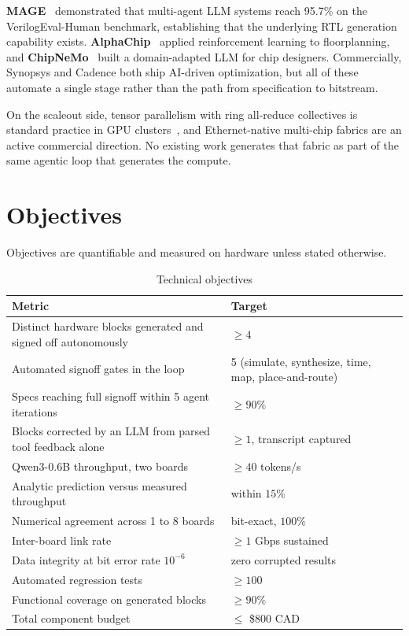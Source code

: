 \documentclass[conference,10pt]{IEEEtran}
\begin{document}
\textbf{MAGE}~\cite{mage} demonstrated that multi-agent LLM systems reach 95.7\% on
the VerilogEval-Human benchmark, establishing that the underlying RTL generation
capability exists. \textbf{AlphaChip}~\cite{alphachip} applied reinforcement
learning to floorplanning, and \textbf{ChipNeMo}~\cite{chipnemo} built a
domain-adapted LLM for chip designers. Commercially, Synopsys and Cadence both ship
AI-driven optimization, but all of these automate a single stage rather than the
path from specification to bitstream.

On the scaleout side, tensor parallelism with ring all-reduce collectives is
standard practice in GPU clusters~\cite{megatron}, and Ethernet-native multi-chip
fabrics are an active commercial direction. No existing work generates that fabric
as part of the same agentic loop that generates the compute.

\section{Objectives}
Objectives are quantifiable and measured on hardware unless stated otherwise.

\begin{table}[h]
\centering
\caption{Technical objectives}
\begin{tabular}{@{}p{4.9cm}p{2.9cm}@{}}
\toprule
\textbf{Metric} & \textbf{Target} \\
\midrule
Distinct hardware blocks generated and signed off autonomously & $\geq 4$ \\
Automated signoff gates in the loop & 5 (simulate, synthesize, time, map, place-and-route) \\
Specs reaching full signoff within 5 agent iterations & $\geq 90\%$ \\
Blocks corrected by an LLM from parsed tool feedback alone & $\geq 1$, transcript captured \\
Qwen3-0.6B throughput, two boards & $\geq 40$ tokens/s \\
Analytic prediction versus measured throughput & within $15\%$ \\
Numerical agreement across 1 to 8 boards & bit-exact, $100\%$ \\
Inter-board link rate & $\geq 1$ Gbps sustained \\
Data integrity at bit error rate $10^{-6}$ & zero corrupted results \\
Automated regression tests & $\geq 100$ \\
Functional coverage on generated blocks & $\geq 90\%$ \\
Total component budget & $\leq$ \$800 CAD \\
\bottomrule
\end{tabular}
\end{table}
\end{document}
